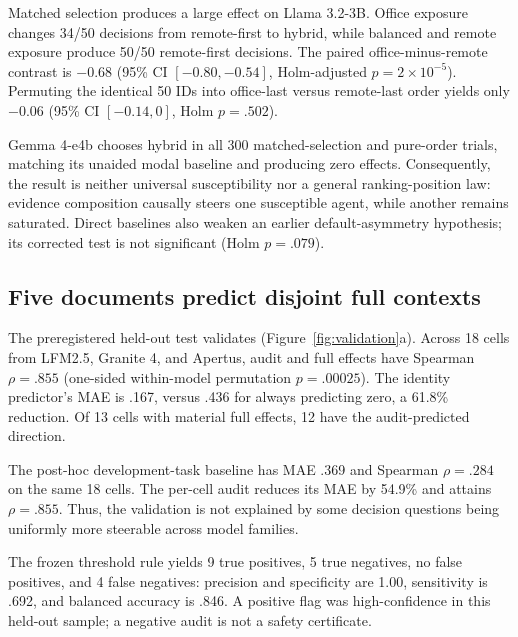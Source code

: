\documentclass{article}
\newcommand{\model}[1]{\textsf{#1}}
\begin{document}
Matched selection produces a large effect on \model{Llama 3.2-3B}. Office
exposure changes 34/50 decisions from remote-first to hybrid, while balanced
and remote exposure produce 50/50 remote-first decisions. The paired
office-minus-remote contrast is $-0.68$ (95\% CI $[-0.80,-0.54]$,
Holm-adjusted $p=2\times10^{-5}$). Permuting the identical 50 IDs into
office-last versus remote-last order yields only $-0.06$ (95\% CI
$[-0.14,0]$, Holm $p=.502$).

\model{Gemma 4-e4b} chooses hybrid in all 300 matched-selection and pure-order
trials, matching its unaided modal baseline and producing zero effects.
Consequently, the result is neither universal susceptibility nor a general
ranking-position law: evidence composition causally steers one susceptible
agent, while another remains saturated. Direct baselines also weaken an
earlier default-asymmetry hypothesis; its corrected test is not significant
(Holm $p=.079$).

\subsection{Five documents predict disjoint full contexts}

The preregistered held-out test validates (Figure~\ref{fig:validation}a).
Across 18 cells from \model{LFM2.5}, \model{Granite 4}, and \model{Apertus},
audit and full effects have Spearman $\rho=.855$ (one-sided within-model
permutation $p=.00025$). The identity predictor's MAE is .167, versus .436 for
always predicting zero, a 61.8\% reduction. Of 13 cells with material full
effects, 12 have the audit-predicted direction.

The post-hoc development-task baseline has MAE .369 and Spearman $\rho=.284$
on the same 18 cells. The per-cell audit reduces its MAE by 54.9\% and attains
$\rho=.855$. Thus, the validation is not explained by some decision questions
being uniformly more steerable across model families.

The frozen threshold rule yields 9 true positives, 5 true negatives, no false
positives, and 4 false negatives: precision and specificity are 1.00,
sensitivity is .692, and balanced accuracy is .846. A positive flag was
high-confidence in this held-out sample; a negative audit is not a safety
certificate.
\end{document}
